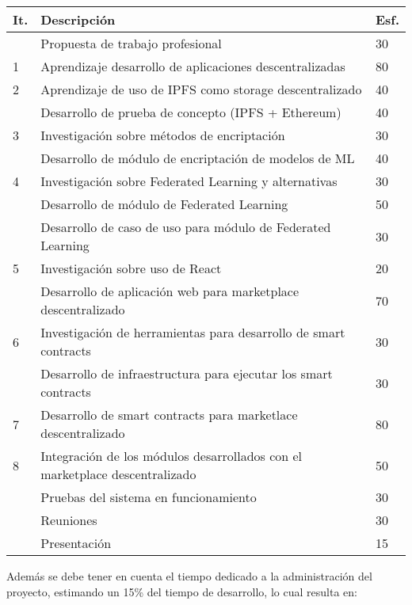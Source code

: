 \documentclass[
11pt, %
oneside, %
spanish, %
singlespacing, %
headsepline, %
chapterinoneline, %
]{MastersDoctoralThesis} %
\begin{document}
{
\setlength{\extrarowheight}{.2em}
\begin{center}
	\begin{tabularx}{\textwidth}{|l|X|l|}
    \hline
    \textbf{It.} & \textbf{Descripción} & \textbf{Esf.}  \\ \hline
	\- & Propuesta de trabajo profesional & 30 \\ \hline  
    1 & Aprendizaje desarrollo de aplicaciones descentralizadas & 80 \\ \hline 
    2 & Aprendizaje de uso de IPFS como storage descentralizado & 40 \\
      & Desarrollo de prueba de concepto (IPFS + Ethereum) & 40 \\ \hline
    3 & Investigación sobre métodos de encriptación & 30 \\
      & Desarrollo de módulo de encriptación de modelos de ML & 40 \\ \hline
    4 & Investigación sobre Federated Learning y alternativas & 30 \\ 
      & Desarrollo de módulo de Federated Learning & 50 \\ 
      & Desarrollo de caso de uso para módulo de Federated Learning & 30 \\ \hline
    5 & Investigación sobre uso de React & 20 \\  
      & Desarrollo de aplicación web para marketplace descentralizado & 70 \\ \hline
    6 & Investigación de herramientas para desarrollo de smart contracts & 30 \\
      & Desarrollo de infraestructura para ejecutar los smart contracts & 30 \\ \hline 
    7 & Desarrollo de smart contracts para marketlace descentralizado & 80 \\ \hline
    8 & Integración de los módulos desarrollados con el marketplace descentralizado & 50 \\ 
      & Pruebas del sistema en funcionamiento & 30 \\ \hline
      & Reuniones & 30 \\ \hline
      & Presentación & 15 \\ \hline
    \end{tabularx}
\end{center}
}

Además se debe tener en cuenta el tiempo dedicado a la administración del proyecto, estimando un 15\% del tiempo de desarrollo, lo cual resulta en:
\end{document}
